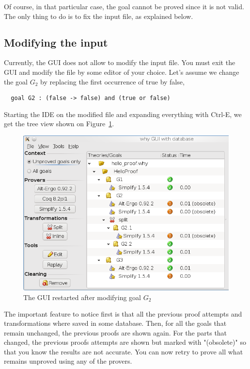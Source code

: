 Of course, in that particular case, the goal cannot be proved since it
is not valid. The only thing to do is to fix the input file, as
explained below.

\subsection{Modifying the input}

Currently, the GUI does not allow to modify the input file. You must
exit the GUI and modify the file by some editor of your choice. Let's assume we change the goal $G_2$ by replacing the first occurrence of true by false, \eg
\begin{verbatim}
  goal G2 : (false -> false) and (true or false)
\end{verbatim}
Starting the IDE on the modified file and expanding everything with
\textsf{Ctrl-E}, we get the tree view shown on Figure~\ref{fig:gui5}.

\begin{figure}[tbp]
  \includegraphics[width=\textwidth]{gui5.png}
  \caption{The GUI restarted after modifying goal $G_2$}
  \label{fig:gui5}
\end{figure}

The important feature to notice first is that all the previous proof
attempts and transformations where saved in some database. Then, for
all the goals that remain unchanged, the previous proofs are shown
again. For the parts that changed, the previous proofs attempts are
shown but marked with "(obsolete)" so that you know the results are
not accurate. You can now retry to prove all what remains unproved
using any of the provers.


